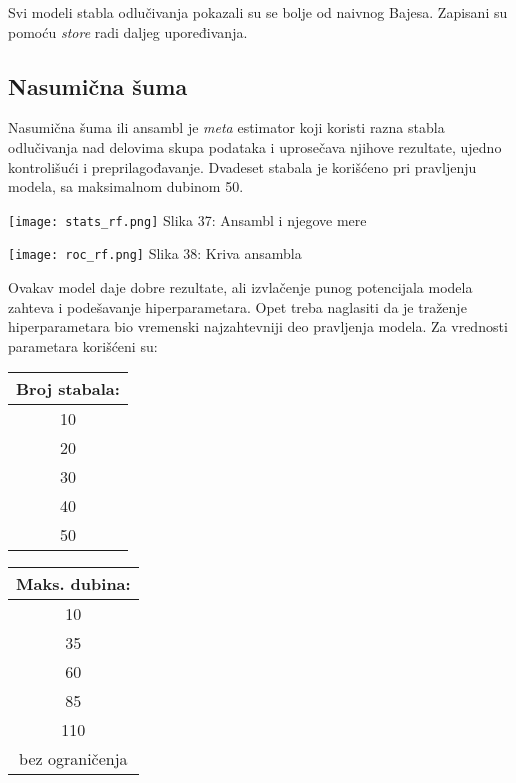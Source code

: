 \documentclass[a4paper]{article}
\begin{document}
{Svi modeli stabla odlučivanja pokazali su se bolje od naivnog Bajesa. Zapisani su pomoću {\em store} radi daljeg upoređivanja.

\subsection{Nasumična šuma}
\label{rf}

Nasumična šuma ili ansambl je {\em meta} estimator koji koristi razna stabla odlučivanja nad delovima skupa podataka i uprosečava njihove rezultate, ujedno kontrolišući i preprilagođavanje. Dvadeset stabala je korišćeno pri pravljenju modela, sa maksimalnom dubinom 50.

\noindent\begin{minipage}{0.4\textwidth}
\texttt{[image: stats\_rf.png]}
Slika 37: Ansambl i njegove mere\\
\end{minipage}
\begin{minipage}{0.6\textwidth}
\texttt{[image: roc\_rf.png]}
\hphantom{aaaaaaaaaaaaa}Slika 38: Kriva ansambla\\
\end{minipage}

Ovakav model daje dobre rezultate, ali izvlačenje punog potencijala modela zahteva i podešavanje hiperparametara. Opet treba naglasiti da je traženje hiperparametara bio vremenski najzahtevniji deo pravljenja modela. Za vrednosti parametara korišćeni su:

\begin{center}
\hphantom{aaaaaaa}
\begin{tabular}{|c|} \hline
Broj stabala:\\ \hline \hline
10\\ \hline
20\\ \hline
30\\ \hline
40\\ \hline
50\\ \hline
\end{tabular}
\hphantom{aaa}
\begin{tabular}{|c|} \hline
Maks. dubina:\\ \hline \hline
10\\ \hline
35\\ \hline
60\\ \hline
85\\ \hline
110\\ \hline
bez ograničenja\\ \hline
\end{tabular}
\end{center}

}
\end{document}
